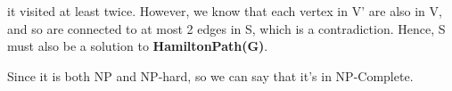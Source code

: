 \documentclass[a4paper]{article}
\begin{document}
\begin{itemize}
		it visited at least twice. However, we know that each vertex in V' are also in V, and
		so are connected to at most 2 edges in S, which is a contradiction. Hence, S must also
		be a solution to \textbf{HamiltonPath(G)}.
\end{itemize}

Since it is both NP and NP-hard, so we can say that it's in NP-Complete.
\end{document}
